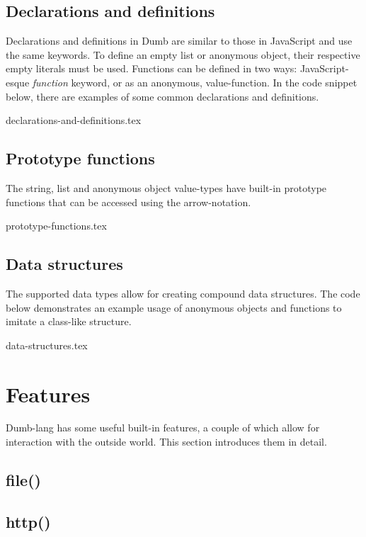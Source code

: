 \documentclass[12pt,a4paper]{article}
\begin{document}
\subsection*{Declarations and definitions}
Declarations and definitions in Dumb are similar to those in JavaScript and use the same keywords. To define an empty list or anonymous object, their respective empty literals must be used. Functions can be defined in two ways: JavaScript-esque \emph{function} keyword, or as an anonymous, value-function. In the code snippet below, there are examples of some common declarations and definitions.

{declarations-and-definitions.tex}



\subsection*{Prototype functions}
The string, list and anonymous object value-types have built-in prototype functions that can be accessed using the arrow-notation.

{prototype-functions.tex}



\subsection*{Data structures}
The supported data types allow for creating compound data structures. The code below demonstrates an example usage of anonymous objects and functions to imitate a class-like structure.

{data-structures.tex}









\section*{Features}
Dumb-lang has some useful built-in features, a couple of which allow for interaction with the outside world. This section introduces them in detail.


\subsection*{file()}


\subsection*{http()}
\end{document}
